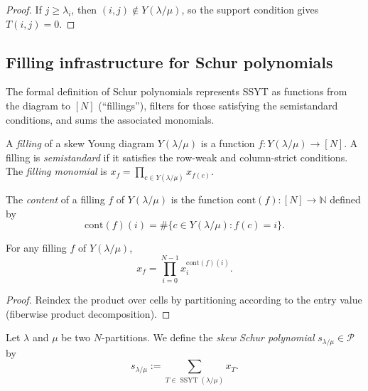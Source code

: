 \begin{proof}
\leanok
If $j \ge \lambda_i$, then $(i,j) \notin Y(\lambda/\mu)$, so the support condition gives $T(i,j) = 0$.
\end{proof}

\subsection{Filling infrastructure for Schur polynomials}

The formal definition of Schur polynomials represents SSYT as functions
from the diagram to $[N]$ (``fillings''), filters for those satisfying
the semistandard conditions, and sums the associated monomials.

\begin{definition}
\label{def.sf.filling}
\leanhelper
\leanok
A \emph{filling} of a skew Young diagram $Y(\lambda/\mu)$ is a function
$f : Y(\lambda/\mu) \to [N]$.
A filling is \emph{semistandard} if it satisfies the row-weak and column-strict conditions.
The \emph{filling monomial} is $x_f = \prod_{c \in Y(\lambda/\mu)} x_{f(c)}$.
\end{definition}

\begin{definition}
\label{def.sf.filling-content}
\leanhelper
\leanok
The \emph{content} of a filling $f$ of $Y(\lambda/\mu)$ is the function
$\mathrm{cont}(f) : [N] \to \mathbb{N}$ defined by
\[
  \mathrm{cont}(f)(i) = \#\{c \in Y(\lambda/\mu) : f(c) = i\}.
\]
\end{definition}

\begin{lemma}
\label{lem.sf.filling-monomial-prod-pow}
\leanhelper
\leanok
For any filling $f$ of $Y(\lambda/\mu)$,
\[
  x_f = \prod_{i=0}^{N-1} x_i^{\mathrm{cont}(f)(i)}.
\]
\end{lemma}

\begin{proof}
\leanok
Reindex the product over cells by partitioning according to the entry value
(fiberwise product decomposition).
\end{proof}

\begin{definition}
\label{def.sf.skew-schur}
\leantarget
\leanok
Let $\lambda$ and $\mu$ be two $N$-partitions. We
define the \emph{skew Schur polynomial} $s_{\lambda/\mu}\in\mathcal{P}$ by%
\[
s_{\lambda/\mu}:=\sum_{T\in\operatorname*{SSYT}\left(  \lambda/\mu\right)
}x_{T}.
\]
\end{definition}

